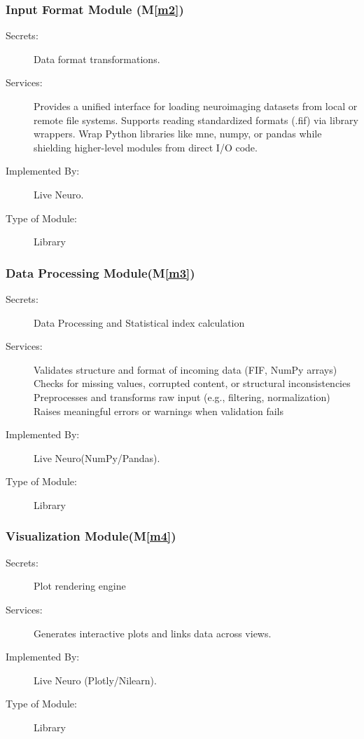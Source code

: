 \documentclass[12pt, titlepage]{article}
\newcommand{\mref}[1]{M\ref{#1}}
\begin{document}
\subsubsection{Input Format Module (\mref{m2})}

\begin{description}
\item[Secrets:]Data format transformations.
\item[Services:]Provides a unified interface for loading neuroimaging datasets from local or remote file systems. Supports reading standardized formats  (.fif)  via library wrappers. Wrap Python libraries like mne, numpy, or pandas while shielding higher-level modules from direct I/O code.
\item[Implemented By:] Live Neuro.
\item[Type of Module:] Library
\end{description}

\subsubsection{Data Processing Module(\mref{m3})}

\begin{description}
\item[Secrets:]Data Processing and Statistical index calculation
\item[Services:]Validates structure and format of incoming data  (FIF, NumPy arrays)  Checks for missing values, corrupted content, or structural inconsistencies Preprocesses and transforms raw input  (e.g.,  filtering, normalization) Raises meaningful errors or warnings when validation fails
\item[Implemented By:] Live Neuro(NumPy/Pandas).
\item[Type of Module:] Library
\end{description}

\subsubsection{Visualization Module(\mref{m4})}

\begin{description}
\item[Secrets:] Plot rendering engine
\item[Services:]Generates interactive plots and links data across views.
\item[Implemented By:] Live Neuro (Plotly/Nilearn).
\item[Type of Module:] Library
\end{description}
\end{document}
